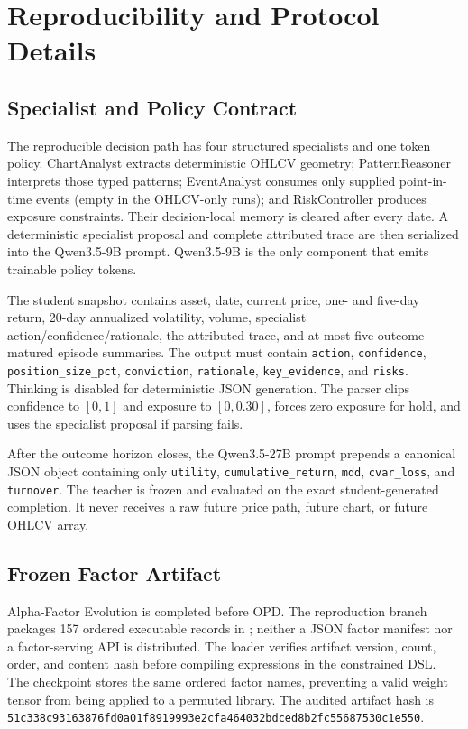 \section{Reproducibility and Protocol Details}
\label{sec:appendix_details}

\subsection{Specialist and Policy Contract}

The reproducible decision path has four structured specialists and one token policy. ChartAnalyst extracts deterministic OHLCV geometry; PatternReasoner interprets those typed patterns; EventAnalyst consumes only supplied point-in-time events (empty in the OHLCV-only runs); and RiskController produces exposure constraints. Their decision-local memory is cleared after every date. A deterministic specialist proposal and complete attributed trace are then serialized into the Qwen3.5-9B prompt. Qwen3.5-9B is the only component that emits trainable policy tokens.

The student snapshot contains asset, date, current price, one- and five-day return, 20-day annualized volatility, volume, specialist action/confidence/rationale, the attributed trace, and at most five outcome-matured episode summaries. The output must contain \texttt{action}, \texttt{confidence}, \texttt{position\_size\_pct}, \texttt{conviction}, \texttt{rationale}, \texttt{key\_evidence}, and \texttt{risks}. Thinking is disabled for deterministic JSON generation. The parser clips confidence to $[0,1]$ and exposure to $[0,0.30]$, forces zero exposure for hold, and uses the specialist proposal if parsing fails.

After the outcome horizon closes, the Qwen3.5-27B prompt prepends a canonical JSON object containing only \texttt{utility}, \texttt{cumulative\_return}, \texttt{mdd}, \texttt{cvar\_loss}, and \texttt{turnover}. The teacher is frozen and evaluated on the exact student-generated completion. It never receives a raw future price path, future chart, or future OHLCV array.

\subsection{Frozen Factor Artifact}

Alpha-Factor Evolution is completed before OPD. The reproduction branch packages 157 ordered executable records in ; neither a JSON factor manifest nor a factor-serving API is distributed. The loader verifies artifact version, count, order, and content hash before compiling expressions in the constrained DSL. The checkpoint stores the same ordered factor names, preventing a valid weight tensor from being applied to a permuted library. The audited artifact hash is \texttt{51c338c93163876f\allowbreak d0a01f8919993e2c\allowbreak fa464032bdced8b2\allowbreak fc55687530c1e550}.

